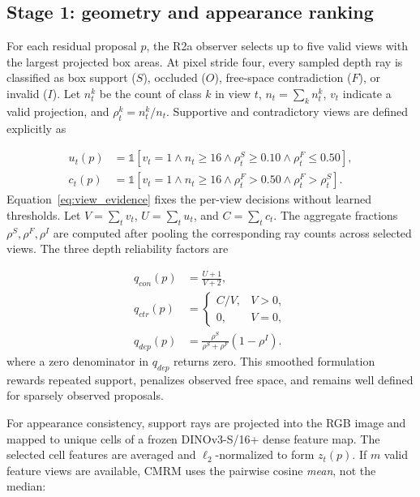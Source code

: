 \documentclass[11pt,a4paper]{article}
\begin{document}
\subsection{Stage 1: geometry and appearance ranking}
For each residual proposal \(p\), the R2a observer selects up to five valid views with the largest projected box areas. At pixel stride four, every sampled depth ray is classified as box support (\(S\)), occluded (\(O\)), free-space contradiction (\(F\)), or invalid (\(I\)). Let \(n_t^k\) be the count of class \(k\) in view \(t\), \(n_t=\sum_k n_t^k\), \(v_t\) indicate a valid projection, and \(\rho_t^k=n_t^k/n_t\). Supportive and contradictory views are defined explicitly as

\begin{equation}
\begin{aligned}
u_t(p)&=\mathbb{1}\!\left[v_t=1\land n_t\ge16\land
\rho_t^S\ge0.10\land\rho_t^F\le0.50\right],\\
c_t(p)&=\mathbb{1}\!\left[v_t=1\land n_t\ge16\land
\rho_t^F>0.50\land\rho_t^F>\rho_t^S\right].
\end{aligned}
\label{eq:view_evidence}
\end{equation}
Equation~\eqref{eq:view_evidence} fixes the per-view decisions without learned thresholds. Let \(V=\sum_t v_t\), \(U=\sum_t u_t\), and \(C=\sum_t c_t\). The aggregate fractions \(\rho^S,\rho^F,\rho^I\) are computed after pooling the corresponding ray counts across selected views. The three depth reliability factors are

\begin{equation}
\begin{aligned}
q_{con}(p)&=\frac{U+1}{V+2},\\
q_{ctr}(p)&=\begin{cases}C/V,&V>0,\\0,&V=0,\end{cases}\\
q_{dep}(p)&=\frac{\rho^S}{\rho^S+\rho^F}(1-\rho^I).
\end{aligned}
\label{eq:depth_quality}
\end{equation}
where a zero denominator in \(q_{dep}\) returns zero. This smoothed formulation rewards repeated support, penalizes observed free space, and remains well defined for sparsely observed proposals.

For appearance consistency, support rays are projected into the RGB image and mapped to unique cells of a frozen DINOv3-S/16+ dense feature map. The selected cell features are averaged and \(\ell_2\)-normalized to form \(z_t(p)\). If \(m\) valid feature views are available, CMRM uses the pairwise cosine \emph{mean}, not the median:
\end{document}
